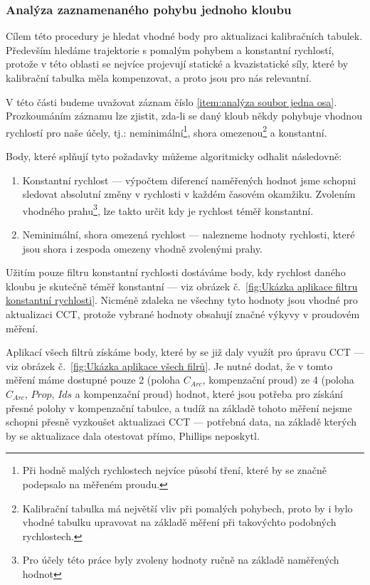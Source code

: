 \subsubsection{Analýza zaznamenaného pohybu jednoho kloubu}\label{section:Analýza záznamu jednoho kloubu}
Cílem této procedury je hledat vhodné body pro aktualizaci kalibračních tabulek. Především hledáme trajektorie s pomalým pohybem a konstantní rychlostí, protože v této oblasti se nejvíce projevují statické a kvazistatické síly, které by kalibrační tabulka měla kompenzovat, a proto jsou pro nás relevantní.\par
V této části budeme uvažovat záznam číslo \ref{item:analýza soubor jedna osa}.
Prozkoumáním záznamu lze zjistit, zda-li se daný kloub někdy pohybuje vhodnou rychlostí pro naše účely, tj.: neminimální\footnote{Při hodně malých rychlostech nejvíce působí tření, které by se značně podepsalo na měřeném proudu.}, shora omezenou\footnote{Kalibrační tabulka má největší vliv při pomalých pohybech, proto by i bylo vhodné tabulku upravovat na základě měření při takovýchto podobných rychlostech.} a konstantní.\par
Body, které splňují tyto požadavky můžeme algoritmicky odhalit následovně:
\begin{enumerate}
    \item Konstantní rychlost --- výpočtem diferencí naměřených hodnot jsme schopni sledovat absolutní změny v rychlosti v každém časovém okamžiku. Zvolením vhodného prahu\footnote{\label{footnote:volba prahu}Pro účely této práce byly zvoleny hodnoty ručně na základě naměřených hodnot}, lze takto určit kdy je rychlost téměř konstantní.
    \item Neminimální, shora omezená rychlost --- nalezneme hodnoty rychlosti, které jsou shora i zespoda omezeny vhodně zvolenými prahy.
\end{enumerate}
Užitím pouze filtru konstantní rychlosti dostáváme body, kdy rychlost daného kloubu je skutečně téměř konstantní --- viz obrázek č.~\ref{fig:Ukázka aplikace filtru konstantní rychlosti}. Nicméně zdaleka ne všechny tyto hodnoty jsou vhodné pro aktualizaci CCT, protože vybrané hodnoty obsahují značné výkyvy v proudovém měření.
\par
Aplikací všech filtrů získáme body, které by se již daly využít pro úpravu CCT --- viz obrázek č.~\ref{fig:Ukázka aplikace všech filrů}. Je nutné dodat, že v tomto měření máme dostupné pouze 2 (poloha $C_{Arc}$, kompenzační proud) ze 4 (poloha $C_{Arc}$, $Prop$, $Ids$ a kompenzační proud) hodnot, které jsou potřeba pro získání přesné polohy v kompenzační tabulce, a tudíž na základě tohoto měření nejsme schopni přesně vyzkoušet aktualizaci CCT --- potřebná data, na základě kterých by se aktualizace dala otestovat přímo, Phillips neposkytl.
